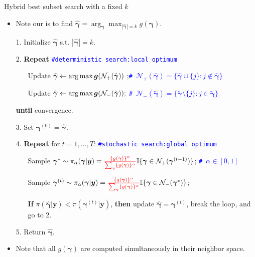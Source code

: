 \documentclass[citecolor=blue,10pt]{beamer}
\def\bg{{\boldsymbol \gamma}}
\newcommand{\0} {\mbox{\boldmath$0$}}
\newcommand{\uy}{{\boldsymbol y}}
\newcommand{\ug} {\mbox{\boldmath$g$}}
\begin{document}
\begin{frame}{Hybrid best subset search with a fixed $k$}
\begin{itemize}
  \item  Note our {\color{red}{Goal (i)}} is to find  $\hat\bg = \arg_{\bg}\max_{|\hat\bg|=k}g(\bg)$. 
  \item[1.] Initialize $\hat{\bg}$ s.t. $|\hat{\bg}|=k$.
  \item[2.] \textbf{Repeat} \quad  \texttt{\textcolor{blue}{\#deterministic search:local optimum}}
        \begin{itemize}\itemsep=2mm
         \item[] Update $\tilde{\bg }\leftarrow \arg\max \ug(\mathcal{N}_+(\hat{\bg} ) )$ ;\quad  \texttt{\textcolor{blue}{\# $\mathcal{N}_+(\hat{\bg})=\{\hat{\bg} \cup \{j\}: j\notin \hat{\bg} \}$}}
         \item[] Update $\hat{\bg}\leftarrow  \arg\max \ug( \mathcal{N}_-(\tilde{\bg} ) );$ \quad \texttt{\textcolor{blue}{\# $\mathcal{N}_-(\tilde{\bg })= \{\tilde{\bg } \setminus \{j\}: j\in \tilde{\bg } \}$}}
        \end{itemize}

  \item[] \textbf{until} convergence.
 \item[3.] Set $\bg^{(0)}=\hat{\bg}$.
  \item[4.] \textbf{Repeat} for $t=1,\ldots,T$:  \quad  \texttt{\textcolor{blue}{\#stochastic search:global optimum}}
        \begin{itemize}\itemsep=2mm
         \item[] Sample $\bg^{*} \sim\pi_\alpha (\bg |\uy)={\color{red}{\frac{\{g(\bg)\}^\alpha}{\sum_{\bg}\{g(\bg)\}^\alpha}}}\mathbb{I}\{\bg\in \mathcal{N}_+({\bg^{(t-1)}} ) \}$;  \quad  \texttt{\textcolor{blue}{\# $\alpha \in [0,1]$}}
         \item[] Sample $\bg^{(t)}\sim \pi_\alpha (\bg |\uy)={\color{red}{\frac{\{g(\bg)\}^\alpha}{\sum_{\bg}\{g(\bg)\}^\alpha}}} \mathbb{I}\{\bg\in \mathcal{N}_-({\bg^{*}} ) \}$;
         \item[] \textbf{If} $\pi(\hat{\bg} |\uy)<\pi({\bg}^{(t)} |\uy)$, \textbf{then} update $\hat{\bg}=\bg^{(t)}$, break the loop, and go to 2.
        \end{itemize}
  \item[5.] Return $\hat{\bg}$.
  \item Note that all $g(\bg)$ are computed simultaneously in their neighbor space. 
 \end{itemize}
\end{frame}
\end{document}
